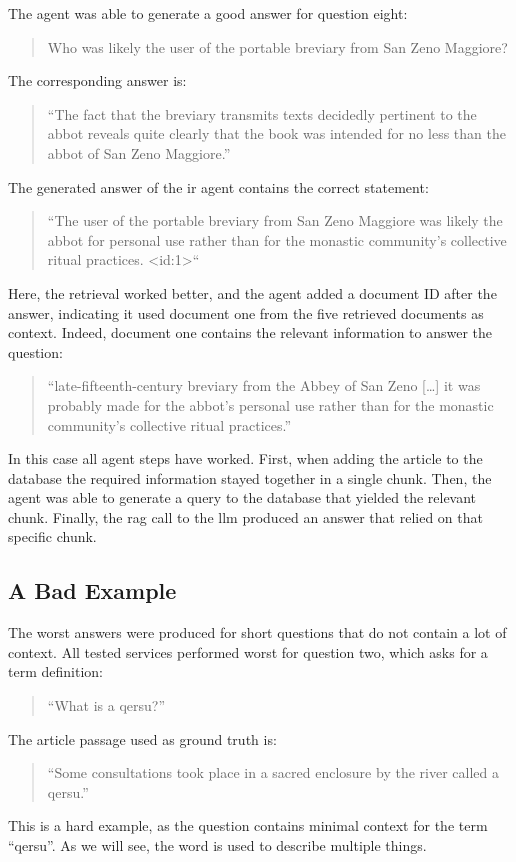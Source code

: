 \documentclass[../main.tex]{subfiles}
\begin{document}
The agent was able to generate a good answer for question eight:
\begin{quote}
      Who was likely the user of the portable breviary from San Zeno Maggiore?
\end{quote}
The corresponding answer is:
\begin{quote}
      ``The fact that the breviary transmits texts decidedly pertinent
      to the abbot reveals quite clearly that the book was intended
      for no less than \textcolor{emph blue}{the abbot of San Zeno Maggiore}.''
\end{quote}
The generated answer of the \gls{ir} agent contains the correct statement:
\begin{quote}
      ``The user of the portable breviary from San Zeno Maggiore was likely
      \textcolor{emph blue}{the abbot} for personal use rather than for the monastic
      community's collective ritual practices. <id:1>``
\end{quote}
Here, the retrieval worked better,
and the agent added a document ID after the answer, indicating it used document
one from the five retrieved documents as context.
Indeed, document one contains the relevant information to answer the question:
\begin{quote}
      ``late-fifteenth-century breviary from the Abbey of San Zeno [\dots]
      it was probably made for the abbot's personal use rather than
      for the monastic community's collective ritual practices.''
\end{quote}
In this case all agent steps have worked.
First, when adding the article to the database the required information stayed
together in a single chunk.
Then, the agent was able to generate a query to the database that yielded the
relevant chunk.
Finally, the \gls{rag} call to the \gls{llm} produced an answer that relied on that
specific chunk.

\subsection{A Bad Example}

The worst answers were produced for short questions that do not contain a lot of context.
All tested services performed worst for question two,
which asks for a term definition:
\begin{quote}
      ``What is a qersu?''
\end{quote}
The article passage used as ground truth is:
\begin{quote}
      ``Some consultations took place in \textcolor{emph blue}{a sacred enclosure}
      by the river \textcolor{emph blue}{called a qersu}.''
\end{quote}
This is a hard example, as the question contains minimal context for the term ``qersu''.
As we will see, the word is used to describe multiple things.
\end{document}
